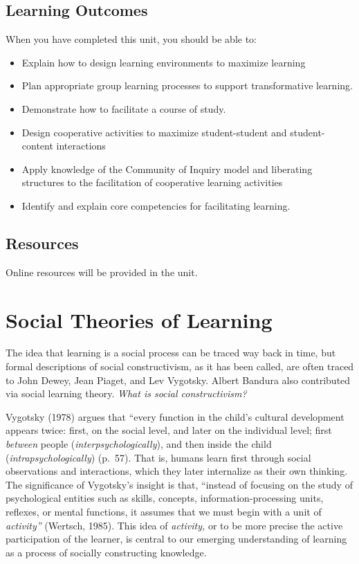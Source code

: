 \documentclass[
]{book}
\providecommand{\tightlist}{%
  \setlength{\itemsep}{0pt}\setlength{\parskip}{0pt}}
\begin{document}
\hypertarget{learning-outcomes-1}{%
\subsection*{Learning Outcomes}\label{learning-outcomes-1}}

When you have completed this unit, you should be able to:

\begin{itemize}
\tightlist
\item
  Explain how to design learning environments to maximize learning
\item
  Plan appropriate group learning processes to support transformative learning.
\item
  Demonstrate how to facilitate a course of study.
\item
  Design cooperative activities to maximize student-student and student-content interactions
\item
  Apply knowledge of the Community of Inquiry model and liberating structures to the facilitation of cooperative learning activities
\item
  Identify and explain core competencies for facilitating learning.
\end{itemize}

\hypertarget{resources-2}{%
\subsection*{Resources}\label{resources-2}}

Online resources will be provided in the unit.

\hypertarget{social-theories-of-learning}{%
\section{Social Theories of Learning}\label{social-theories-of-learning}}

The idea that learning is a social process can be traced way back in time, but formal descriptions of social constructivism, as it has been called, are often traced to John Dewey, Jean Piaget, and Lev Vygotsky. Albert Bandura also contributed via social learning theory. \emph{What is social constructivism?}

Vygotsky (1978) argues that ``every function in the child's cultural development appears twice: first, on the social level, and later on the individual level; first \emph{between} people (\emph{interpsychologically}), and then inside the child (\emph{intrapsychologically}) (p.~57). That is, humans learn first through social observations and interactions, which they later internalize as their own thinking. The significance of Vygotsky's insight is that, ``instead of focusing on the study of psychological entities such as skills, concepts, information-processing units, reflexes, or mental functions, it assumes that we must begin with a unit of \emph{activity''} (Wertsch, 1985). This idea of \emph{activity,} or to be more precise the active participation of the learner, is central to our emerging understanding of learning as a process of socially constructing knowledge.
\end{document}
